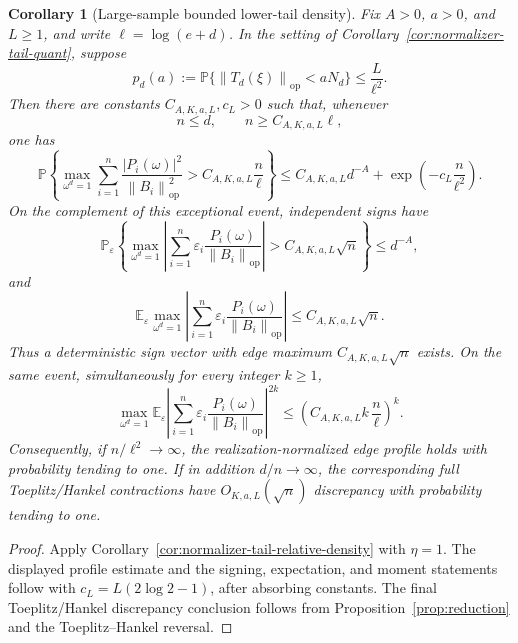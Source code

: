 \documentclass[11pt]{amsart}
\numberwithin{equation}{section}
\newtheorem{corollary}[theorem]{Corollary}
\theoremstyle{definition}
\theoremstyle{remark}
\newcommand{\op}{\mathrm{op}}
\newcommand{\Prob}{\mathbb P}
\newcommand{\Exp}{\mathbb E}
\newcommand{\norm}[1]{\left\lVert #1\right\rVert}
\newcommand{\abs}[1]{\left\lvert #1\right\rvert}
\newcommand{\eps}{\varepsilon}
\begin{document}
\begin{corollary}[Large-sample bounded lower-tail density]
\label{cor:normalizer-tail-large-sample}
Fix \(A>0\), \(a>0\), and \(L\ge1\), and write \(\ell=\log(e+d)\).  In the
setting of Corollary~\ref{cor:normalizer-tail-quant}, suppose
\[
  p_d(a):=\Prob\{\norm{T_d(\xi)}_{\op}<aN_d\}\le \frac{L}{\ell^2}.
\]
Then there are constants \(C_{A,K,a,L},c_L>0\) such that, whenever
\[
  n\le d,\qquad n\ge C_{A,K,a,L}\ell ,
\]
one has
\[
  \Prob\left\{
  \max_{\omega^d=1}
  \sum_{i=1}^n
  \frac{\abs{P_i(\omega)}^2}{\norm{B_i}_{\op}^2}
  > C_{A,K,a,L}\frac n\ell
  \right\}
  \le C_{A,K,a,L}d^{-A}+\exp\left(-c_L\frac n{\ell^2}\right).
\]
On the complement of this exceptional event, independent signs have
\[
  \Prob_\eps\left\{
  \max_{\omega^d=1}\left|\sum_{i=1}^n
  \eps_i\frac{P_i(\omega)}{\norm{B_i}_{\op}}\right|
  > C_{A,K,a,L}\sqrt n
  \right\}\le d^{-A},
\]
and
\[
  \Exp_\eps\max_{\omega^d=1}\left|\sum_{i=1}^n
  \eps_i\frac{P_i(\omega)}{\norm{B_i}_{\op}}\right|
  \le C_{A,K,a,L}\sqrt n .
\]
Thus a deterministic sign vector with edge maximum \(C_{A,K,a,L}\sqrt n\)
exists.  On the same event, simultaneously for every integer \(k\ge1\),
\[
  \max_{\omega^d=1}
  \Exp_\eps\left|\sum_{i=1}^n
  \eps_i\frac{P_i(\omega)}{\norm{B_i}_{\op}}\right|^{2k}
  \le
  \left(C_{A,K,a,L}k\,\frac n\ell\right)^k .
\]
Consequently, if \(n/\ell^2\to\infty\), the realization-normalized
edge profile holds with probability tending to one.  If in addition
\(d/n\to\infty\), the corresponding full Toeplitz/Hankel contractions have
\(O_{K,a,L}(\sqrt n)\) discrepancy with probability tending to one.
\end{corollary}

\begin{proof}
Apply Corollary~\ref{cor:normalizer-tail-relative-density} with \(\eta=1\).
The displayed profile estimate and the signing, expectation, and moment
statements follow with \(c_L=L(2\log2-1)\), after absorbing constants.  The final
Toeplitz/Hankel discrepancy conclusion follows from Proposition~\ref{prop:reduction}
and the Toeplitz--Hankel reversal.
\end{proof}
\end{document}
